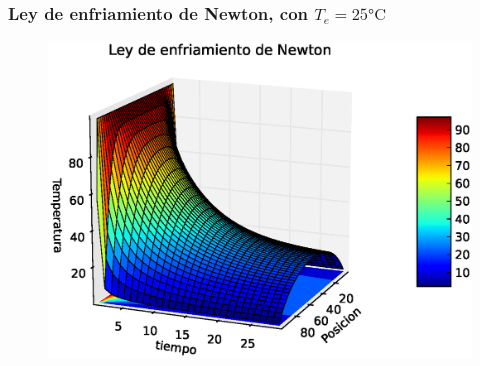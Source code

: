 \begin{frame}
\frametitle{Ley de enfriamiento de Newton, con $T_{e}=25 \si\celsius$}
\begin{figure}
	\centering
	\includegraphics[scale=0.5]{Imagenes/EqCalor09.eps}  
\end{figure}
\end{frame}


